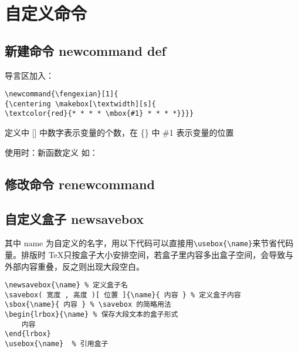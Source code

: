\section{自定义命令}

\subsection{新建命令 newcommand def}
导言区加入：
\begin{lstlisting}[language={[LaTeX]TeX}]
\newcommand{\fengexian}[1]{
{\centering \makebox[\textwidth][s]{
\textcolor{red}{* * * * \mbox{#1} * * * *}}}}
\end{lstlisting}
定义中 [] 中数字表示变量的个数，在 \{\} 中 \#1 表示变量的位置
\begin{cmd}[label=用法]
\newcommand{\新函数}{新函数定义}
使用时：\新函数
如：
\end{cmd}

\subsection{修改命令 renewcommand}


\subsection{自定义盒子 newsavebox}
其中 name 为自定义的名字，用以下代码可以直接用\verb|\usebox{\name}|来节省代码量。排版时 \TeX 只按盒子大小安排空间，若盒子里内容多出盒子空间，会导致与外部内容重叠，反之则出现大段空白。
\begin{lstlisting}
\newsavebox{\name} % 定义盒子名
\savebox( 宽度 , 高度 )[ 位置 ]{\name}{ 内容 } % 定义盒子内容
\sbox{\name}{ 内容 } % \savebox 的简略用法
\begin{lrbox}{\name} % 保存大段文本的盒子形式
    内容
\end{lrbox}
\usebox{\name}  % 引用盒子
\end{lstlisting}

